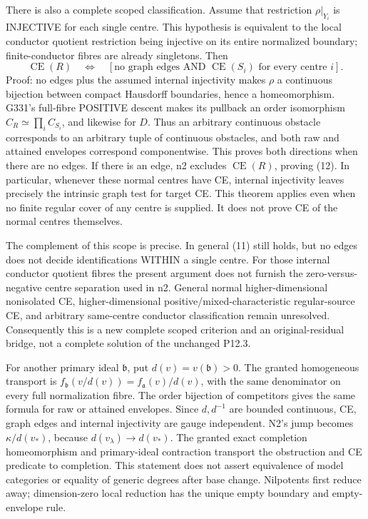 \documentclass[11pt]{article}
\begin{document}
There is also a complete scoped classification. Assume that restriction
$\rho|_{Y_i}$ is INJECTIVE for each single centre. This hypothesis is
equivalent to the local conductor quotient restriction being injective
on its entire normalized boundary; finite-conductor fibres are already
singletons. Then
\[
 \operatorname{CE}(R)\quad\Longleftrightarrow\quad
 \left[\text{no graph edges AND }\operatorname{CE}(S_i)
                  \text{ for every centre }i\right].             \tag{12}
\]
Proof: no edges plus the assumed internal injectivity makes $\rho$ a
continuous bijection between compact Hausdorff boundaries, hence a
homeomorphism. G331's full-fibre POSITIVE descent makes its pullback an
order isomorphism $C_R\simeq\prod_i C_{S_i}$, and likewise for $D$.
Thus an arbitrary continuous obstacle corresponds to an arbitrary tuple
of continuous obstacles, and both raw and attained envelopes correspond
componentwise. This proves both directions when there are no edges.
If there is an edge, n2 excludes $\operatorname{CE}(R)$, proving (12).
In particular, whenever these normal centres have CE, internal
injectivity leaves precisely the intrinsic graph test for target CE.
This theorem applies even when no finite regular cover of any centre is
supplied. It does not prove CE of the normal centres themselves.

The complement of this scope is precise. In general (11) still holds,
but no edges does not decide identifications WITHIN a single centre.
For those internal conductor quotient fibres the present argument does
not furnish the zero-versus-negative centre separation used in n2.
General normal higher-dimensional nonisolated CE, higher-dimensional
positive/mixed-characteristic regular-source CE, and arbitrary
same-centre conductor classification remain unresolved. Consequently
this is a new complete scoped criterion and an original-residual bridge,
not a complete solution of the unchanged P12.3.

For another primary ideal $\mathfrak b$, put $d(v)=v(\mathfrak b)>0$.
The granted homogeneous transport is
$f_{\mathfrak b}(v/d(v))=f_{\mathfrak a}(v)/d(v)$, with the same
denominator on every full normalization fibre. The order bijection of
competitors gives the same formula for raw or attained envelopes.
Since $d,d^{-1}$ are bounded continuous, CE, graph edges and internal
injectivity are gauge independent. N2's jump becomes
$\kappa/d(v_*)$, because $d(v_\lambda)\to d(v_*)$.
The granted exact completion homeomorphism and primary-ideal contraction
transport the obstruction and CE predicate to completion. This statement
does not assert equivalence of model categories or equality of generic
degrees after base change. Nilpotents first reduce away; dimension-zero
local reduction has the unique empty boundary and empty-envelope rule.
\end{document}
